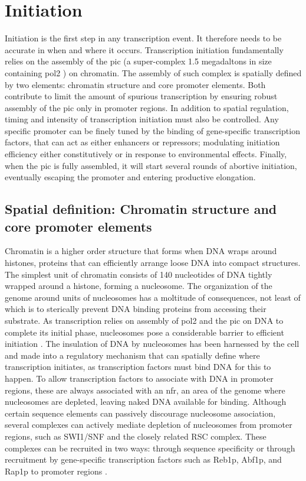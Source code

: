 \section{Initiation}

Initiation is the first step in any transcription event. 
It therefore needs to be accurate in when and where it occurs. 
Transcription initiation fundamentally relies on the assembly of the \gls{pic} (a super-complex 1.5 megadaltons in size  containing \gls{pol2} \cite{fazal:2015:realtime}) on chromatin.
The assembly of such complex is spatially defined by two elements: chromatin structure and core promoter elements.
Both contribute to limit the amount of spurious transcription by ensuring robust assembly of the \gls{pic} only in promoter regions.
In addition to spatial regulation, timing and intensity of transcription initiation must also be controlled.
Any specific promoter can be finely tuned by the binding of gene-specific transcription factors, that can act as either enhancers or repressors; modulating initiation efficiency either constitutively or in response to environmental effects. 
Finally, when the \gls{pic} is fully assembled, it will start several rounds of abortive initiation, eventually escaping the promoter and entering productive elongation.

\subsection{Spatial definition: Chromatin structure and core promoter elements}

Chromatin is a higher order structure that forms when DNA wraps around histones, proteins that can efficiently arrange loose DNA into compact structures.
The simplest unit of chromatin consists of 140 nucleotides of DNA tightly wrapped around a histone, forming a nucleosome.
The organization of the genome around units of nucleosomes has a moltitude of consequences, not least of which is to sterically prevent DNA binding proteins from accessing their substrate. 
As transcription relies on assembly of \gls{pol2} and the \gls{pic} on DNA to complete its initial phase, nucleosomes pose a considerable barrier to efficient initiation \cite{field:2008:distinct} \cite{jiang:2009:compiled}.
The insulation of DNA by nucleosomes has been harnessed by the cell and made into a regulatory mechanism that can spatially define where transcription initiates, as transcription factors must bind DNA for this to happen. 
To allow transcription factors to associate with DNA in promoter regions, these are always associated with an \gls{nfr}, an area of the genome where nucleosomes are depleted, leaving naked DNA available for binding.
Although certain sequence elements can passively discourage nucleosome association, several complexes can actively mediate depletion of nucleosomes from promoter regions, such as SWI1/SNF and the closely related RSC complex.
These complexes can be recruited in two ways: through sequence specificity \cite{badis:2008:library, kubik:2015:two}or through recruitment by gene-specific transcription factors such as Reb1p, Abf1p, and Rap1p to promoter regions \citep{floer:2010:rscnucleosome, hartley:2009:mechanisms, spain:2014:rsc, badis:2008:library}.

